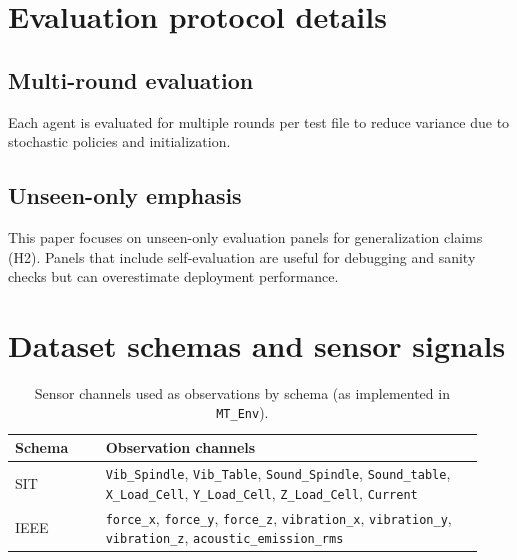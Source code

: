 \documentclass[sn-basic]{sn-jnl} %
\begin{document}
\begin{appendices}
\section{Evaluation protocol details}
\label{app:eval}
\subsection{Multi-round evaluation}
Each agent is evaluated for multiple rounds per test file to reduce variance due to stochastic policies and initialization.

\subsection{Unseen-only emphasis}
This paper focuses on unseen-only evaluation panels for generalization claims (H2). Panels that include self-evaluation are useful for debugging and sanity checks but can overestimate deployment performance.

\section{Dataset schemas and sensor signals}
\label{app:schema}
\begin{table}[t]
\centering
\caption{Sensor channels used as observations by schema (as implemented in \texttt{MT\_Env}).}
\label{tab:schema_features}
\begin{tabular}{p{0.18\linewidth} p{0.75\linewidth}}
\toprule
\textbf{Schema} & \textbf{Observation channels}\\
\midrule
SIT & \texttt{Vib\_Spindle}, \texttt{Vib\_Table}, \texttt{Sound\_Spindle}, \texttt{Sound\_table}, \texttt{X\_Load\_Cell}, \texttt{Y\_Load\_Cell}, \texttt{Z\_Load\_Cell}, \texttt{Current}\\
IEEE & \texttt{force\_x}, \texttt{force\_y}, \texttt{force\_z}, \texttt{vibration\_x}, \texttt{vibration\_y}, \texttt{vibration\_z}, \texttt{acoustic\_emission\_rms}\\
\bottomrule
\end{tabular}
\end{table}


\end{appendices}
\end{document}
